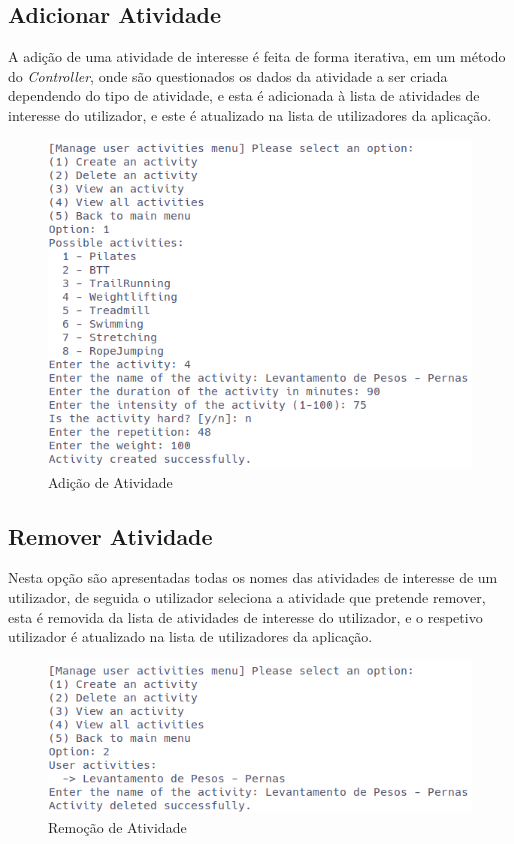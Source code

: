 \documentclass[a4paper,12pt]{scrreprt}
\begin{document}
    \clearpage
    \subsection{Adicionar Atividade}

    A adição de uma atividade de interesse é feita de forma iterativa, em um método do \textit{Controller},
    onde são questionados os dados da atividade a ser criada dependendo do tipo de atividade,
    e esta é adicionada à lista de atividades de interesse do utilizador,
    e este é atualizado na lista de utilizadores da aplicação.

    \begin{figure}[!ht]
        \centering
        \includegraphics[width=\textwidth]{images/addActivity.png}
        \caption{Adição de Atividade}
        \label{fig:add-activity}
    \end{figure}

    \clearpage
    \subsection{Remover Atividade}
    Nesta opção são apresentadas todas os nomes das atividades de interesse de um utilizador,
    de seguida o utilizador seleciona a atividade que pretende remover,
    esta é removida da lista de atividades de interesse do utilizador,
    e o respetivo utilizador é atualizado na lista de utilizadores da aplicação.

    \begin{figure}[!ht]
        \centering
        \includegraphics[width=\textwidth]{images/deleteActivity.png}
        \caption{Remoção de Atividade}
        \label{fig:remove-activity}
    \end{figure}
\end{document}
